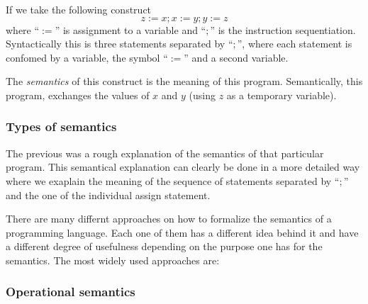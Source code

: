 If we take the following construct
\begin{equation*}
z:=x; x:=y; y:=z
\end{equation*}
where ``$:=$'' is assignment to a variable and ``$;$'' is the instruction sequentiation.
Syntactically this is three statements separated by ``$;$'', where each statement is confomed by a variable, the symbol ``$:=$'' and a second variable.

The \textit{semantics} of this construct is the meaning of this program.
Semantically, this program, exchanges the values of $x$ and $y$ (using $z$ as a temporary variable).

\subsubsection{Types of semantics}

The previous was a rough explanation of the semantics of that particular program.
This semantical explanation can clearly be done in a more detailed way where we exaplain the meaning of the sequence of statements separated by ``$;$'' and the one of the individual assign statement.

There are many differnt approaches on how to formalize the semantics of a programming language.
Each one of them has a different idea behind it and have a different degree of usefulness depending on the purpose one has for the semantics.
The most widely used approaches are:

\begin{comment}
  \begin{itemize}
    \item{Operational semantics:}
    The meaning is specified by the computation on a machine when executing the program.
    The interest lies on the ``\textit{how} the effect of a computation is produced.''~\parencite{nielson}
    \item{Denotational semantics:}
    The meaning of a construct are modelled mathematically by objects that represent the effect of executing the construct.
    Here the main interest lies in the effect and not how it was obtained.
    \item{Axiomatic semantics:}
    Here the main interest lies in expressing some properties of the construct in the form of assertions.
  \end{itemize}
\end{comment}

\subsubsection{Operational semantics}

